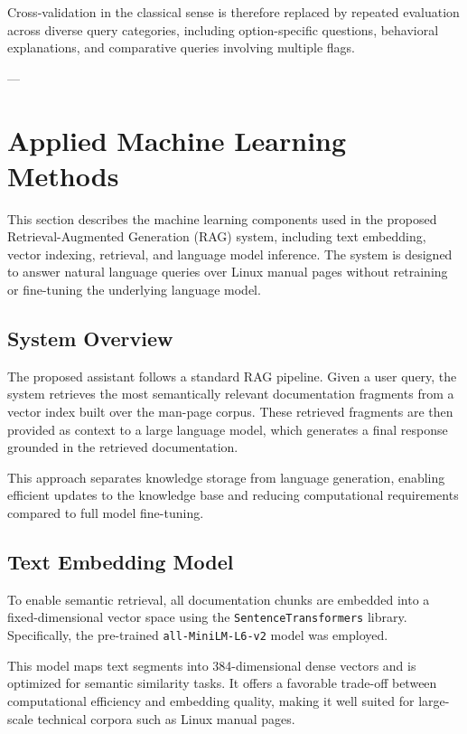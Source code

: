 \documentclass[conference]{IEEEtran}
\begin{document}
Cross-validation in the classical sense is therefore replaced by repeated evaluation across diverse query categories, including option-specific questions, behavioral explanations, and comparative queries involving multiple flags.

---

\section{Applied Machine Learning Methods}

This section describes the machine learning components used in the proposed Retrieval-Augmented Generation (RAG) system, including text embedding, vector indexing, retrieval, and language model inference. The system is designed to answer natural language queries over Linux manual pages without retraining or fine-tuning the underlying language model.

\subsection{System Overview}

The proposed assistant follows a standard RAG pipeline. Given a user query, the system retrieves the most semantically relevant documentation fragments from a vector index built over the man-page corpus. These retrieved fragments are then provided as context to a large language model, which generates a final response grounded in the retrieved documentation.

This approach separates knowledge storage from language generation, enabling efficient updates to the knowledge base and reducing computational requirements compared to full model fine-tuning.

\subsection{Text Embedding Model}

To enable semantic retrieval, all documentation chunks are embedded into a fixed-dimensional vector space using the \texttt{SentenceTransformers} library. Specifically, the pre-trained \texttt{all-MiniLM-L6-v2} model was employed.

This model maps text segments into 384-dimensional dense vectors and is optimized for semantic similarity tasks. It offers a favorable trade-off between computational efficiency and embedding quality, making it well suited for large-scale technical corpora such as Linux manual pages.
\end{document}
